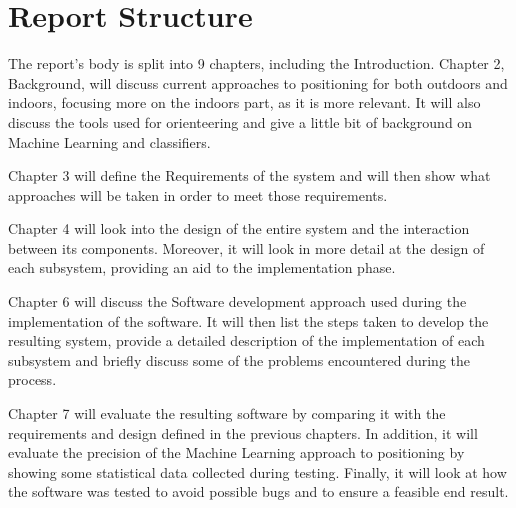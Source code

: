\documentclass[12pt]{informatics-report}
\begin{document}
\section{Report Structure}
The report's body is split into 9 chapters, including the Introduction.
Chapter 2, Background, will discuss current approaches to positioning for both outdoors and indoors, focusing more on the indoors part, as it is more relevant. It will also discuss the tools used for orienteering and give a little bit of background on Machine Learning and classifiers. 

Chapter 3 will define the Requirements of the system and will then show what approaches will be taken in order to meet those requirements.

Chapter 4 will look into the design of the entire system and the interaction between its components. Moreover, it will look in more detail at the design of each subsystem, providing an aid to the implementation phase.

Chapter 6 will discuss the Software development approach used during the implementation of the software. It will then list the steps taken to develop the resulting system, provide a detailed description of the implementation of each subsystem and briefly discuss some of the problems encountered during the process.

Chapter 7 will evaluate the resulting software by comparing it with the requirements and design defined in the previous chapters. In addition, it will evaluate the precision of the Machine Learning approach to positioning by showing some statistical data collected during testing. Finally, it will look at how the software was tested to avoid possible bugs and to ensure a feasible end result.
 















\appendix



\end{document}
